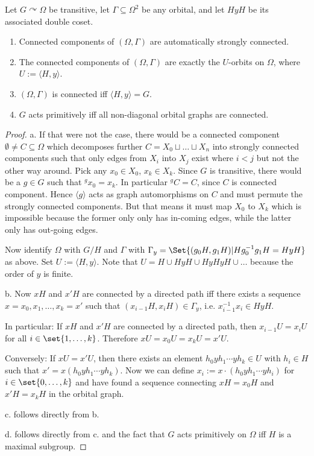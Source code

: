 \documentclass[fontsize=11pt,fleqn,a4paper]{scrartcl}
\begin{document}
\begin{corollary}
Let $G \curvearrowright \Omega$ be transitive, let $\Gamma\subseteq\Omega^2$ be any orbital, and let $HyH$ be its associated double coset.

\begin{enumerate}
\item Connected components of $(\Omega,\Gamma)$ are automatically strongly connected.
\item The connected components of $(\Omega,\Gamma)$ are exactly the $U$-orbits on $\Omega$, where $U:=\langle H,y\rangle$.
\item $(\Omega,\Gamma)$ is connected iff $\langle H,y\rangle = G$.
\item $G$ acts primitively iff all non-diagonal orbital graphs are connected.
\end{enumerate}
\end{corollary}
\begin{proof}
a. If that were not the case, there would be a connected component $\emptyset\neq C\subseteq\Omega$ which decomposes further $C=X_0 \sqcup \ldots \sqcup X_n$ into strongly connected components such that only edges from $X_i$ into $X_j$ exist where $i<j$ but not the other way around. Pick any $x_0\in X_0$, $x_k\in X_k$. Since $G$ is transitive, there would be a $g\in G$ such that ${^g x_0} =x_k$. In particular ${^g C}=C$, since $C$ is connected component. Hence $\langle g\rangle$ acts as graph automorphisms on $C$ and must permute the strongly connected components. But that means it must map $X_0$ to $X_k$ which is impossible because the former only only has in-coming edges, while the latter only has out-going edges.

\medbreak
Now identify $\Omega$ with $G/H$ and $\Gamma$ with $\Gamma_y=\Set{(g_0H,g_1H) | Hg_0^{-1}g_1H = HyH}$ as above. Set $U:=\langle H,y\rangle$. Note that $U=H\cup HyH\cup HyHyH\cup\ldots$ because the order of $y$ is finite.

\medbreak
b. Now $xH$ and $x'H$ are connected by a directed path iff there exists a sequence $x=x_0,x_1,\ldots,x_k=x'$ such that $(x_{i-1}H,x_i H)\in\Gamma_y$, i.e. $x_{i-1}^{-1} x_i \in HyH$.

In particular: If $xH$ and $x'H$ are connected by a directed path, then $x_{i-1}U = x_i U$ for all $i\in\set{1,\ldots,k}$. Therefore $xU=x_0U = x_k U = x'U$.

Conversely: If $xU=x'U$, then there exists an element $h_0 y h_1 \cdots y h_k \in U$ with $h_i\in H$ such that $x' = x(h_0 y h_1 \cdots y h_k)$. Now we can define $x_i := x \cdot (h_0 y h_1 \cdots y h_i)$ for $i\in\set{0,\ldots,k}$ and have found a sequence connecting $xH=x_0H$ and $x'H=x_kH$ in the orbital graph.

\medbreak
c. follows directly from b.

\medbreak
d. follows directly from c. and the fact that $G$ acts primitively on $\Omega$ iff $H$ is a maximal subgroup.
\end{proof}
\end{document}
